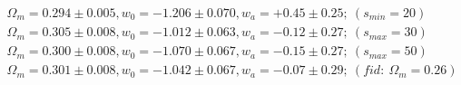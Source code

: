 \documentclass[useAMS,usenatbib]{mnras}
\begin{document}
\begin{eqnarray}
\Omega_m = 0.294 \pm 0.005, w_0 = -1.206 \pm 0.070, w_a = +0.45 \pm 0.25;\ (s_{min}=20)\\
\Omega_m = 0.305 \pm 0.008, w_0 = -1.012 \pm 0.063, w_a = -0.12 \pm 0.27;\ (s_{max}=30)\\
 \Omega_m = 0.300 \pm 0.008, w_0 = -1.070 \pm 0.067, w_a = -0.15 \pm 0.27;\ (s_{max}=50)\\
 \Omega_m = 0.301 \pm 0.008, w_0 = -1.042 \pm 0.067, w_a = -0.07 \pm 0.29;\ (fid:\ \Omega_m=0.26)\\

\end{eqnarray}
\end{document}
